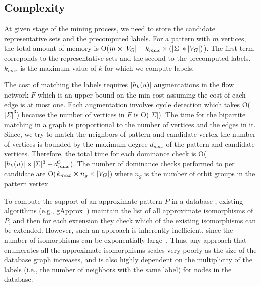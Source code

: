 \subsection{Complexity}
 At given stage of the mining process,
we need to store the candidate representative sets and the precomputed 
\khop labels. For a pattern with $m$ vertices, the total amount of memory
is O($m \times |V_G| + k_{max} \times ( |\Sigma| * |V_G|)$). The first term
correponds to the representative sets and the second to the precomputed
\khop labels. $k_{max}$ is the maximum value of $k$ for which we compute \khop
labels.

 The cost of matching the \khop labels
requires $|h_{k}(u)|$ augmentations in the flow network $F$ which is an
upper bound on the min cost assuming the cost of each edge is at most one. Each
augmentation involves cycle detection which takes O($|\Sigma|^3$) because the
number of vertices in $F$ is O($|\Sigma|$).  The time for the bipartite matching
in a graph is proportional to the number of vertices and the edges in it.
Since, we try to match the neighbors of pattern and candidate vertex the number
of vertices is bounded by the maximum degree $d_{max}$ of the pattern and
candidate vertices. Therefore, the total time for each dominance check is
O($|h_{k}(u)| \times |\Sigma|^3 + d_{max}^{3}$).  The number of dominance
checks performed to per candidate are O($k_{max} \times n_g \times |V_G|$) where
$n_g$ is the number of orbit groups in the pattern vertex. 

To compute the support of an approximate pattern $P$ in a database \db,
existing algorithms (e.g., gApprox~\cite{gapprox}) maintain the list of
all approximate isomorphisms of $P$, and then for each extension they
check which of the existing isomorphisms can be extended. However, such an
approach is inherently inefficient, since the number of isomorphisms can
be exponentially large~\cite{2011-icdm}.  Thus, any approach that
enumerates all the approximate isomorphisms scales very poorly as the size
of the database graph increases, and is also highly dependent on the
multiplicity of the labels (i.e., the number of neighbors with the same
label) for nodes in the database.

